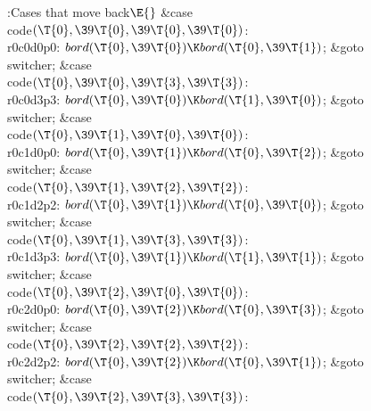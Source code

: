 \Y\B\4:Cases that move back\X${}\E{}$\6
\4\&{case} \\{code}${}(\T{0},\39\T{0},\39\T{0},\39\T{0}){}$:\5
\\{r0c0d0p0}:\5
${}\\{bord}(\T{0},\39\T{0})\K\\{bord}(\T{0},\39\T{1}){}$;\5
\&{goto} \\{switcher};\6
\4\&{case} \\{code}${}(\T{0},\39\T{0},\39\T{3},\39\T{3}){}$:\5
\\{r0c0d3p3}:\5
${}\\{bord}(\T{0},\39\T{0})\K\\{bord}(\T{1},\39\T{0}){}$;\5
\&{goto} \\{switcher};\6
\4\&{case} \\{code}${}(\T{0},\39\T{1},\39\T{0},\39\T{0}){}$:\5
\\{r0c1d0p0}:\5
${}\\{bord}(\T{0},\39\T{1})\K\\{bord}(\T{0},\39\T{2}){}$;\5
\&{goto} \\{switcher};\6
\4\&{case} \\{code}${}(\T{0},\39\T{1},\39\T{2},\39\T{2}){}$:\5
\\{r0c1d2p2}:\5
${}\\{bord}(\T{0},\39\T{1})\K\\{bord}(\T{0},\39\T{0}){}$;\5
\&{goto} \\{switcher};\6
\4\&{case} \\{code}${}(\T{0},\39\T{1},\39\T{3},\39\T{3}){}$:\5
\\{r0c1d3p3}:\5
${}\\{bord}(\T{0},\39\T{1})\K\\{bord}(\T{1},\39\T{1}){}$;\5
\&{goto} \\{switcher};\6
\4\&{case} \\{code}${}(\T{0},\39\T{2},\39\T{0},\39\T{0}){}$:\5
\\{r0c2d0p0}:\5
${}\\{bord}(\T{0},\39\T{2})\K\\{bord}(\T{0},\39\T{3}){}$;\5
\&{goto} \\{switcher};\6
\4\&{case} \\{code}${}(\T{0},\39\T{2},\39\T{2},\39\T{2}){}$:\5
\\{r0c2d2p2}:\5
${}\\{bord}(\T{0},\39\T{2})\K\\{bord}(\T{0},\39\T{1}){}$;\5
\&{goto} \\{switcher};\6
\4\&{case} \\{code}${}(\T{0},\39\T{2},\39\T{3},\39\T{3}){}$:\5
